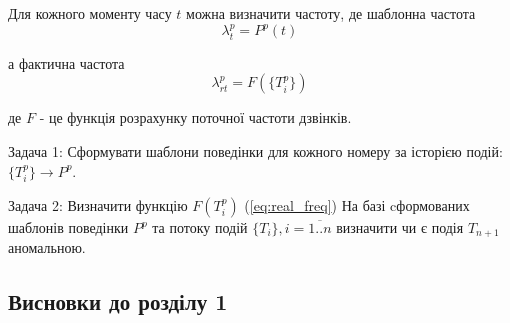   Для кожного моменту часу $t$ можна визначити частоту, де шаблонна частота 
\begin{equation}\label{eq:pattern_freq} \lambda_t^p = P^p(t) \end{equation}

  а фактична частота
 \begin{equation}\label{eq:real_freq} \lambda_{rt}^p = F(\{T_i^p\}) \end{equation}
 \begin{ESKDexplanation}
    \item де $F$ - це функція розрахунку поточної частоти дзвінків.
  \end{ESKDexplanation}

  Задача 1: Сформувати шаблони поведінки для кожного номеру за історією подій: $\{T_i^{p}\} \rightarrow P^{p}$.

  Задача 2: Визначити функцію $F({T_i^p})$ (\ref{eq:real_freq}) На базі cформованих шаблонів поведінки $P^{p}$ та потоку подій $\{T_i\}, i = \overline{1..n}$ визначити чи є подія $T_{n+1}$ аномальною.

\newpage
\subsection*{Висновки до розділу 1}
    \TBD


